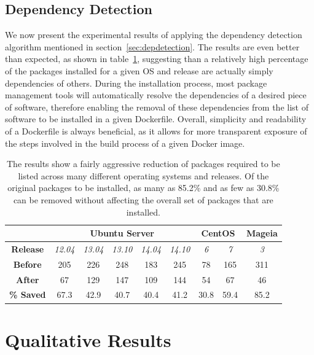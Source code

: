 \subsection{Dependency Detection}
We now present the experimental results of applying the dependency detection algorithm mentioned in section~\ref{sec:depdetection}. The results are even better than expected, as shown in table~\ref{table:culling}, suggesting than a relatively high percentage of the packages installed for a given OS and release are actually simply dependencies of others. During the installation process, most package management tools will automatically resolve the dependencies of a desired piece of software, therefore enabling the removal of these dependencies from the list of software to be installed in a given Dockerfile. Overall, simplicity and readability of a Dockerfile is always beneficial, as it allows for more transparent exposure of the steps involved in the build process of a given Docker image.

\begin{table}[h]
\centering

    \begin{tabular}{| c | c | c | c | c | c | c | c | c |}
    \hline
& \multicolumn{5}{|c|}{\bfseries Ubuntu Server} & \multicolumn{2}{|c|}{\bfseries CentOS} & \multicolumn{1}{|c|}{\bfseries Mageia} \\ \hline
    \bfseries Release & \itshape 12.04 & \itshape 13.04 & \itshape 13.10 & \itshape 14.04 & \itshape 14.10  & \itshape 6 & \itshape 7 & \itshape 3 \\ \hline
    \bfseries Before & 205 & 226 & 248 & 183 & 245 & 78 & 165 & 311\\ \hline
    \bfseries After & 67 & 129 & 147 & 109 & 144 & 54 & 67 & 46   \\ \hline \hline
    \bfseries \% Saved & 67.3 & 42.9 & 40.7 & 40.4 & 41.2 & 30.8 & 59.4 & 85.2\\
    \hline
    \end{tabular}
\caption{The results show a fairly aggressive reduction of packages required to be listed across many different operating systems and releases. Of the original packages to be installed, as many as 85.2\% and as few as 30.8\% can be removed without affecting the overall set of packages that are installed.}
\label{table:culling}
\end{table}

\section{Qualitative Results}
